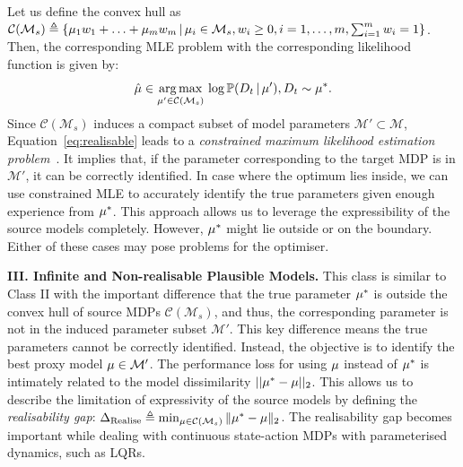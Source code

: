 Let us define the convex hull as $\mathcal{C}(\mathcal{M}_s) \triangleq \{\mu_1 w_1 + \hdots + \mu_m w_m \, | \, \mu_i \in \mathcal{M}_s, w_i \geq 0, i=1, \hdots, m, \sum_{i=1}^m w_i = 1\}$. Then, the corresponding MLE problem with the corresponding likelihood function is given by:
\begin{equation}\label{eq:realisable}
    \hat{\mu} \in \underset{\mu' \in \mathcal{C}(\mathcal{M}_s)}{\arg\max} \, \log \mathbb{P}(D_t \, | \, \mu'), D_t \sim \mu^{*}.
\end{equation}
Since $\mathcal{C}(\mathcal{M}_s)$ induces a compact subset of model parameters $\mathcal{M}' \subset \mathcal{M}$, Equation~\eqref{eq:realisable} leads to a \emph{constrained maximum likelihood estimation problem}~\citep{aitchison1958maximum}. It implies that, if the parameter corresponding to the target MDP is in $\mathcal{M}'$, it can be correctly identified. In case where the optimum lies inside, we can use constrained MLE to accurately identify the true parameters given enough experience from $\mu^{*}$. This approach allows us to leverage the expressibility of the source models completely. However, $\mu^{*}$ might lie outside or on the boundary. Either of these cases may pose problems for the optimiser.

\textbf{III. Infinite and Non-realisable Plausible Models.}\label{subsec:non-realisable}
This class is similar to Class II with the important difference that the true parameter $\mu^*$ is outside the convex hull of source MDPs $\mathcal{C}(\mathcal{M}_s)$, and thus, the corresponding parameter is not in the induced parameter subset $\mathcal{M}'$. This key difference means the true parameters cannot be correctly identified. 
Instead, the objective is to identify the best proxy model $\mu \in \mathcal{M}'$. The performance loss for using $\mu$ instead of $\mu^{*}$ is intimately related to the model dissimilarity $||\mu^{*}-\mu||_2$. This allows us to describe the limitation of expressivity of the source models by defining the \textit{realisability gap}: $\Delta_{\mathrm{Realise}} \triangleq \min_{\mu \in \mathcal{C}(\mathcal{M}_s)}\|\mu^{*}-\mu\|_2 $. The realisability gap becomes important while dealing with continuous state-action MDPs with parameterised dynamics, such as LQRs. %

